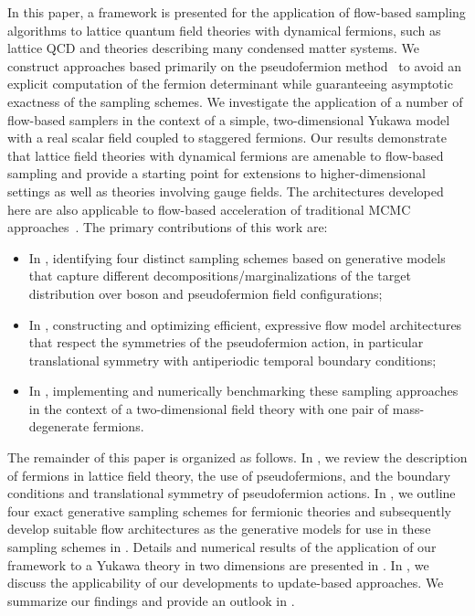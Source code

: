 \documentclass[aps,prd,twocolumn,nofootinbib,superscriptaddress,preprintnumbers]{revtex4-1}
\begin{document}
In this paper, a framework is presented for the application of flow-based sampling algorithms to lattice quantum field theories with dynamical fermions, such as lattice QCD and theories describing many condensed matter systems. We construct approaches based primarily on the pseudofermion method~\cite{Weingarten:1980hx} to avoid an explicit computation of the fermion determinant while guaranteeing asymptotic exactness of the sampling schemes. We investigate the application of a number of flow-based samplers in the context of a simple, two-dimensional Yukawa model with a real scalar field coupled to staggered fermions. Our results demonstrate that lattice field theories with dynamical fermions are amenable to flow-based sampling and provide a starting point for extensions to higher-dimensional settings as well as theories involving gauge fields. The architectures developed here are also applicable to flow-based acceleration of traditional MCMC approaches~\cite{song2018anicemc,levy2018generalizing,medvidovic2021generative,Foreman:2021ixr,gabrie2021adaptive}. The primary contributions of this work are:
%
\begin{itemize}
    \item In , identifying four distinct sampling schemes based on generative models that capture different decompositions/marginalizations of the target distribution over boson and pseudofermion field configurations;
    \item In , constructing and optimizing efficient, expressive flow model architectures that respect the symmetries of the pseudofermion action, in particular translational symmetry with antiperiodic temporal boundary conditions;
    \item In , implementing and numerically benchmarking these sampling approaches in the context of a two-dimensional field theory with one pair of mass-degenerate fermions.
\end{itemize}

The remainder of this paper is organized as follows. In , we review the description of fermions in lattice field theory, the use of pseudofermions, and the boundary conditions and translational symmetry of pseudofermion actions. In , we outline four exact generative sampling schemes for fermionic theories and subsequently develop suitable flow architectures as the generative models for use in these sampling schemes in . Details and numerical results of the application of our framework to a Yukawa theory in two dimensions are presented in . In , we discuss the applicability of our developments to update-based approaches. We summarize our findings and provide an outlook in .
\end{document}
